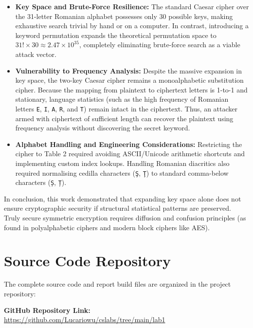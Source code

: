 \documentclass{labreport}
\begin{document}
\begin{itemize}[leftmargin=*]
    \item \textbf{Key Space and Brute-Force Resilience:} The standard Caesar cipher over the 31-letter Romanian alphabet possesses only 30 possible keys, making exhaustive search trivial by hand or on a computer. In contrast, introducing a keyword permutation expands the theoretical permutation space to $31! \times 30 \approx 2.47 \times 10^{35}$, completely eliminating brute-force search as a viable attack vector.
    \item \textbf{Vulnerability to Frequency Analysis:} Despite the massive expansion in key space, the two-key Caesar cipher remains a monoalphabetic substitution cipher. Because the mapping from plaintext to ciphertext letters is 1-to-1 and stationary, language statistics (such as the high frequency of Romanian letters \texttt{E}, \texttt{I}, \texttt{A}, \texttt{R}, and \texttt{T}) remain intact in the ciphertext. Thus, an attacker armed with ciphertext of sufficient length can recover the plaintext using frequency analysis without discovering the secret keyword.
    \item \textbf{Alphabet Handling and Engineering Considerations:} Restricting the cipher to Table 2 required avoiding ASCII/Unicode arithmetic shortcuts and implementing custom index lookups. Handling Romanian diacritics also required normalising cedilla characters (\texttt{Ş}, \texttt{Ţ}) to standard comma-below characters (\texttt{Ș}, \texttt{Ț}).
\end{itemize}

In conclusion, this work demonstrated that expanding key space alone does not ensure cryptographic security if structural statistical patterns are preserved. Truly secure symmetric encryption requires diffusion and confusion principles (as found in polyalphabetic ciphers and modern block ciphers like AES).

\section{Source Code Repository}

The complete source code and report build files are organized in the project repository:

\begin{center}
    \textbf{GitHub Repository Link:}\\
    \url{https://github.com/Lucariowu/cslabs/tree/main/lab1}
\end{center}
\end{document}
